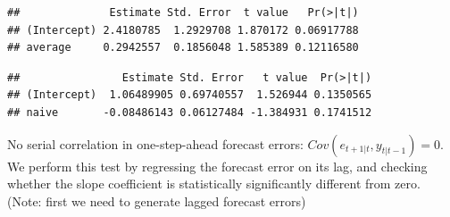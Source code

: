 \documentclass[
  12pt,
  oneside]{book}
\newenvironment{Shaded}{\begin{snugshade}}{\end{snugshade}}
\newcommand{\AttributeTok}[1]{\textcolor[rgb]{0.77,0.63,0.00}{#1}}
\newcommand{\FunctionTok}[1]{\textcolor[rgb]{0.00,0.00,0.00}{#1}}
\newcommand{\NormalTok}[1]{#1}
\newcommand{\SpecialCharTok}[1]{\textcolor[rgb]{0.00,0.00,0.00}{#1}}
\newcommand{\StringTok}[1]{\textcolor[rgb]{0.31,0.60,0.02}{#1}}
\begin{document}
\begin{Shaded}
\end{Shaded}

\begin{verbatim}
##              Estimate Std. Error  t value   Pr(>|t|)
## (Intercept) 2.4180785  1.2929708 1.870172 0.06917788
## average     0.2942557  0.1856048 1.585389 0.12116580
\end{verbatim}

\begin{Shaded}
\end{Shaded}

\begin{verbatim}
##                Estimate Std. Error   t value  Pr(>|t|)
## (Intercept)  1.06489905 0.69740557  1.526944 0.1350565
## naive       -0.08486143 0.06127484 -1.384931 0.1741512
\end{verbatim}

No serial correlation in one-step-ahead forecast errors: \(Cov(e_{t+1|t},y_{t|t-1})=0\). We perform this test by regressing the forecast error on its lag, and checking whether the slope coefficient is statistically significantly different from zero.
(Note: first we need to generate lagged forecast errors)

\begin{Shaded}
\end{Shaded}
\end{document}
